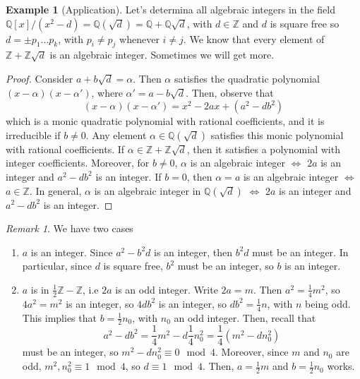 \documentclass[12pt]{article}
\theoremstyle{definition}
\newtheorem{eg}[thm]{Example}
\theoremstyle{remark}
\newtheorem{rmk}[thm]{Remark}
\numberwithin{equation}{section}
\newcommand\Z{\mathbb Z}    %
\newcommand\Q{\mathbb Q}    %
\begin{document}
\begin{eg}[Application]
        Let's determina all algebraic integers in the field $\Q[x]/(x^2-d) = \Q(\sqrt{d}) = \Q+\Q\sqrt{d}$, with $d \in \Z$ and $d$ is square free so $d = \pm p_1...p_k$, with $p_i\neq p_j$ whenever $i\neq j$. We know that every element of $\Z+\Z\sqrt{d}$ is an algebraic integer. Sometimes we will get more.
\end{eg}
\begin{proof}
        Consider $a+b\sqrt{d} = \alpha$. Then $\alpha$ satisfies the quadratic polynomial $(x-\alpha)(x-\alpha')$, where $\alpha' = a-b\sqrt{d}$. Then, observe that \begin{equation}
                (x-\alpha)(x-\alpha') = x^2 - 2ax + (a^2-db^2)
        \end{equation}
        which is a monic quadratic polynomial with rational coefficients, and it is irreducible if $b \neq 0$. Any element $\alpha \in \Q(\sqrt{d})$ satisfies this monic polynomial with rational coefficients. If $\alpha \in \Z + \Z\sqrt{d}$, then it satisfies a polynomial with integer coefficients. Moreover, for $b\neq 0$, $\alpha$ is an algebraic integer $\iff$ $2a$ is an integer and $a^2 - db^2$ is an integer. If $b = 0$, then $\alpha = a$ is an algebraic integer $\iff$ $a \in \Z$. In general, $\alpha$ is an algebraic integer in $\Q(\sqrt{d})$ $\iff$ $2a$ is an integer and $a^2-db^2$ is an integer.
\end{proof}

\vspace{15pt}

\begin{rmk}
        We have two cases \begin{enumerate}
                \item $a$ is an integer. Since $a^2-b^2d$ is an integer, then $b^2d$ must be an integer. In particular, since $d$ is square free, $b^2$ must be an integer, so $b$ is an integer.
                \item $a$ is in $\frac{1}{2}\Z - \Z$, i.e $2a$ is an odd integer. Write $2a = m$. Then $a^2 = \frac{1}{4}m^2$, so $4a^2=m^2$ is an integer, so $4db^2$ is an integer, so $db^2 = \frac{1}{4}n$, with $n$ being odd. This implies that $b = \frac{1}{2}n_0$, with $n_0$ an odd integer. Then, recall that \begin{equation}
                                a^2-db^2 = \frac{1}{4}m^2 - d\frac{1}{4}n_0^2 = \frac{1}{4}(m^2-dn_0^2)
                \end{equation}
                        must be an integer, so $m^2-dn_0^2 \equiv 0 \mod 4$. Moreover, since $m$ and $n_0$ are odd, $m^2,n_0^2 \equiv 1 \mod 4$, so $d \equiv 1 \mod 4$. Then, $a = \frac{1}{2}m$ and $b = \frac{1}{2}n_0$ works.
        \end{enumerate}
\end{rmk}
\end{document}

